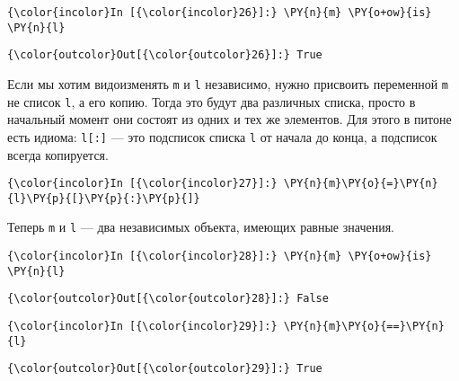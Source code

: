     \begin{Verbatim}[commandchars=\\\{\}]
{\color{incolor}In [{\color{incolor}26}]:} \PY{n}{m} \PY{o+ow}{is} \PY{n}{l}
\end{Verbatim}

            \begin{Verbatim}[commandchars=\\\{\}]
{\color{outcolor}Out[{\color{outcolor}26}]:} True
\end{Verbatim}
        
    Если мы хотим видоизменять \texttt{m} и \texttt{l} независимо, нужно
присвоить переменной \texttt{m} не список \texttt{l}, а его копию. Тогда
это будут два различных списка, просто в начальный момент они состоят из
одних и тех же элементов. Для этого в питоне есть идиома:
\texttt{l{[}:{]}} --- это подсписок списка \texttt{l} от начала до конца,
а подсписок всегда копируется.

    \begin{Verbatim}[commandchars=\\\{\}]
{\color{incolor}In [{\color{incolor}27}]:} \PY{n}{m}\PY{o}{=}\PY{n}{l}\PY{p}{[}\PY{p}{:}\PY{p}{]}
\end{Verbatim}

    Теперь \texttt{m} и \texttt{l} --- два независимых объекта, имеющих равные
значения.

    \begin{Verbatim}[commandchars=\\\{\}]
{\color{incolor}In [{\color{incolor}28}]:} \PY{n}{m} \PY{o+ow}{is} \PY{n}{l}
\end{Verbatim}

            \begin{Verbatim}[commandchars=\\\{\}]
{\color{outcolor}Out[{\color{outcolor}28}]:} False
\end{Verbatim}
        
    \begin{Verbatim}[commandchars=\\\{\}]
{\color{incolor}In [{\color{incolor}29}]:} \PY{n}{m}\PY{o}{==}\PY{n}{l}
\end{Verbatim}

            \begin{Verbatim}[commandchars=\\\{\}]
{\color{outcolor}Out[{\color{outcolor}29}]:} True
\end{Verbatim}
        
